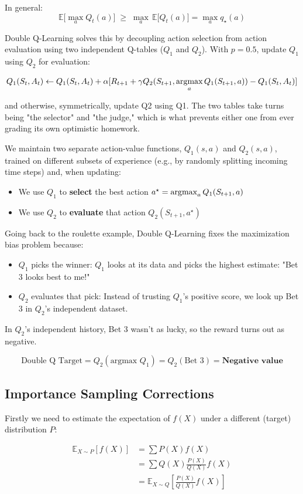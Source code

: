 In general: 
\[
    \mathbb{E}\big[\max_a Q_t(a)\big] \;\geq\; \max_a\, \mathbb{E}\big[Q_t(a)\big] = \max_a q_\star(a)
\]


Double Q-Learning solves this by decoupling action selection from action evaluation using two independent Q-tables ($Q_1$ and $Q_2$). With $p = 0.5$, update $Q_1$ using $Q_2$ for evaluation:

$$Q_1(S_t,A_t) \gets Q_1(S_t,A_t) + \alpha [R_{t+1} + \gamma Q_2(S_{t+1}, \operatorname*{argmax}_a Q_1(S_{t+1},a)) - Q_1(S_t,A_t)]$$ 

and otherwise, symmetrically, update Q2 using Q1. The two tables take turns being "the selector" and "the judge," which is what prevents either one from ever grading its own optimistic homework.

We maintain two separate action-value functions, $Q_1(s, a)$ and $Q_2(s, a)$, trained on different subsets of experience (e.g., by randomly splitting incoming time steps) and, when updating:
\begin{itemize}
    \item We use $Q_1$ to \textbf{select} the best action $a^\star = \operatorname*{argmax}_a Q_1(S_{t+1},a)$
    \item We use $Q_2$ to \textbf{evaluate} that action $Q_2(S_{t+1}, a^\star)$
\end{itemize}

Going back to the roulette example, Double Q-Learning fixes the maximization bias problem because:
\begin{itemize}
    \item $Q_1$ picks the winner: $Q_1$ looks at its data and picks the highest estimate: "Bet 3 looks best to me!"
    \item $Q_2$ evaluates that pick: Instead of trusting $Q_1$'s positive score, we look up Bet 3 in $Q_2$'s independent dataset.
\end{itemize}

In $Q_2$'s independent history, Bet 3 wasn't as lucky, so the reward turns out as negative.

$$\text{Double Q Target} = Q_2(\text{argmax } Q_1) = Q_2(\text{Bet 3}) = \textbf{Negative value} $$


\subsection{Importance Sampling Corrections}
Firstly we need to estimate the expectation of $f(X)$ under a different (target) distribution $P$:

\begin{align*}
    \mathbb{E}_{X \sim P}[f(X)] &= \sum P(X)f(X) \\
                                &= \sum Q(X) \frac{P(X)}{Q(X)}f(X) \\
                                &= \mathbb{E}_{X \sim Q}\left[ \frac{P(X)}{Q(X)}f(X) \right]
\end{align*}


